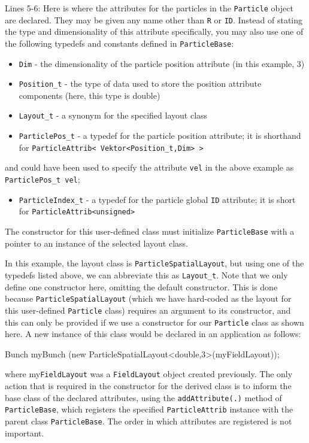 Lines 5-6: Here is where the attributes for the particles in the \texttt{Particle} object are declared. They may be given any name other than \texttt{R} or \texttt{ID}. Instead of stating the type and dimensionality of this attribute specifically, you may also use one of the following typedefs and constants defined in \texttt{ParticleBase}:
\begin{itemize}
          \item \texttt{Dim} - the dimensionality of the particle position attribute (in this example, 3)
          \item \texttt{Position\_t} - the type of data used to store the position attribute components (here, this type is double)
          \item \texttt{Layout\_t} - a synonym for the specified layout class
          \item \texttt{ParticlePos\_t} - a typedef for the particle position attribute; it is shorthand for \texttt{ParticleAttrib< Vektor<Position\_t,Dim> >}
\end{itemize}
and could have been used to specify the attribute \texttt{vel} in the above example as \texttt{ParticlePos\_t vel};
\begin{itemize}
\item \texttt{ParticleIndex\_t} - a typedef for the particle global \texttt{ID} attribute; it is short for \texttt{ParticleAttrib<unsigned>}
\end{itemize}
The constructor for this user-defined class must initialize \texttt{ParticleBase} with a pointer to an instance of the selected layout class.

In this example, the layout class is \texttt{ParticleSpatialLayout}, but using one of the typedefs listed above, we can abbreviate this as \texttt{Layout\_t}. Note that we only define one constructor here, omitting the default constructor. This is done because \texttt{ParticleSpatialLayout} (which we have hard-coded as the layout for this user-defined \texttt{Particle} class) requires an argument to its constructor, and this can only be provided if we use a constructor for our \texttt{Particle} class as shown here. A new instance of this class would be declared in an application as follows:
\begin{smallcode}
Bunch myBunch (new ParticleSpatialLayout<double,3>(myFieldLayout));
\end{smallcode}
where my\texttt{FieldLayout} was a \texttt{FieldLayout} object created previously. The only action that is required in the constructor for the derived class is to inform the base class of the declared attributes,
using the \texttt{addAttribute(.)} method of \texttt{ParticleBase}, which registers the specified \texttt{ParticleAttrib} instance with the parent class \texttt{ParticleBase}. The order in which attributes are registered is not important.


